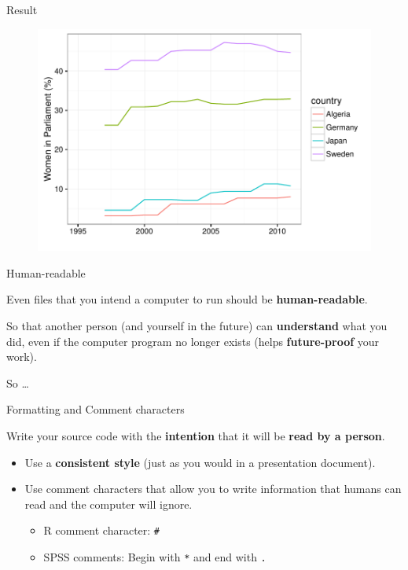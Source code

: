 \documentclass[10pt]{beamer}
\begin{document}
\begin{frame}{Result}

    \begin{figure}
        \includegraphics[scale=0.5]{img/women_compare.pdf}
    \end{figure}

\end{frame}

\begin{frame}{Human-readable}

    Even files that you intend a computer to run should be \textbf{human-readable}.

    \vspace{1.5cm}

    So that another person (and yourself in the future) can \textbf{understand} what you did, even if the computer program no longer exists (helps \textbf{future-proof} your work).

    \vspace{0.5cm}

    So \ldots

\end{frame}

\begin{frame}{Formatting and Comment characters}

    Write your source code with the \textbf{intention} that it will be \textbf{read by a person}.

    \begin{itemize}
        \item Use a \textbf{consistent style} (just as you would in a presentation document).

        \item Use \alert{comment characters} that allow you to write information that humans can read and the computer will ignore.

            \begin{itemize}
                \item R comment character: \texttt{\#}
                \item SPSS comments: Begin with \texttt{*} and end with \texttt{.}
            \end{itemize}
    \end{itemize}


\end{frame}
\end{document}
